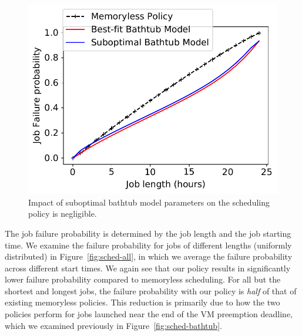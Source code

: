 \documentclass[sigconf]{acmart} %
\begin{document}
\begin{figure}
\begin{minipage}[c]{0.3\linewidth}
    \includegraphics[width=\linewidth]{wrong-model.pdf}
    \vspace*{-0.8cm}
  \caption{Impact of suboptimal bathtub model parameters on the scheduling policy is negligible.}
  \label{fig:wrong-model}
\end{minipage}
\vspace*{-0.4cm}
\end{figure}

The job failure probability is determined by the job length and the job starting time.
We examine the failure probability for jobs of different lengths (uniformly distributed) in Figure~\ref{fig:sched-all}, in which we average the failure probability across different start times.
We again see that our policy results in significantly lower failure probability compared to memoryless scheduling.
For all but the shortest and longest jobs, the failure probability with our policy is \emph{half} of that of existing memoryless policies. 
This reduction is primarily due to how the two policies perform for jobs launched near the end of the VM preemption deadline, which we examined previously in Figure~\ref{fig:sched-bathtub}. 
\end{document}

